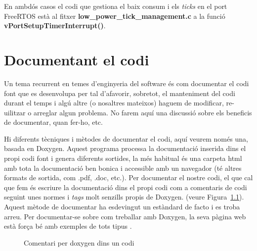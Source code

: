 En ambdós casos el codi que gestiona el baix consum i els {\em ticks} en el port FreeRTOS està al fitxer {\bf low\_power\_tick\_management.c} a la funció {\bf vPortSetupTimerInterrupt()}.

\chapter{Documentant el codi}
\label{sec:documentant}
Un tema recurrent en temes d'enginyeria del software és com documentar el codi font que es desenvolupa per tal d'afavorir, sobretot, el manteniment del codi durant el temps i algú altre (o nosaltres mateixos) haguem de modificar, re-uilitzar o arreglar algun problema. No farem aquí una discussió sobre els beneficis de documentar, quan fer-ho, etc.

Hi diferents tècniques i mètodes de documentar el codi, aquí veurem només una, basada en Doxygen. Aquest programa processa la documentació inserida dins el propi codi font i genera diferents sortides, la més habitual és una carpeta html amb tota la documentació ben bonica i accessible amb un navegador (té altres formats de sortida, com .pdf, .doc, etc.). Per documentar el nostre codi, el que cal que fem és escriure la documentació dins el propi codi com a comentaris de codi seguint unes normes i {\em tags} molt senzills propis de Doxygen. (veure Figura~\ref{fig:doxygencode}). Aquest mètode de documentar ha esdevingut un estàndard de facto i es troba arreu. Per documentar-se sobre com treballar amb Doxygen, la seva pàgina web està força bé amb exemples de tots tipus \cite{Doxygen}.

\begin{figure}
 \centering
 \caption{Comentari per doxygen dins un codi}
 \label{fig:doxygencode}
\end{figure}

